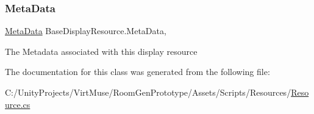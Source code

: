\subsubsection{\texorpdfstring{Meta\+Data}{MetaData}}
{\footnotesize\ttfamily \mbox{\hyperlink{class_meta_data}{Meta\+Data}} Base\+Display\+Resource.\+Meta\+Data\hspace{0.3cm}{\ttfamily [get]}, {\ttfamily [set]}}



The Metadata associated with this display resource 



The documentation for this class was generated from the following file\+:\begin{DoxyCompactItemize}
\item 
C\+:/\+Unity\+Projects/\+Virt\+Muse/\+Room\+Gen\+Prototype/\+Assets/\+Scripts/\+Resources/\mbox{\hyperlink{_resource_8cs}{Resource.\+cs}}\end{DoxyCompactItemize}
